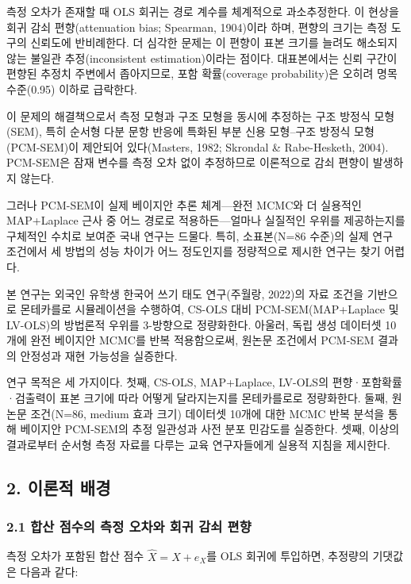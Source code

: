\documentclass[a4paper,10pt]{oblivoir}
\begin{document}
측정 오차가 존재할 때 OLS 회귀는 경로 계수를 체계적으로 과소추정한다. 이 현상을 회귀 감쇠 편향(attenuation bias; Spearman, 1904)이라 하며, 편향의 크기는 측정 도구의 신뢰도에 반비례한다. 더 심각한 문제는 이 편향이 표본 크기를 늘려도 해소되지 않는 불일관 추정(inconsistent estimation)이라는 점이다. 대표본에서는 신뢰 구간이 편향된 추정치 주변에서 좁아지므로, 포함 확률(coverage probability)은 오히려 명목 수준(0.95) 이하로 급락한다.

이 문제의 해결책으로서 측정 모형과 구조 모형을 동시에 추정하는 구조 방정식 모형(SEM), 특히 순서형 다분 문항 반응에 특화된 부분 신용 모형--구조 방정식 모형(PCM-SEM)이 제안되어 있다(Masters, 1982; Skrondal \& Rabe-Hesketh, 2004). PCM-SEM은 잠재 변수를 측정 오차 없이 추정하므로 이론적으로 감쇠 편향이 발생하지 않는다.

그러나 PCM-SEM이 실제 베이지안 추론 체계—완전 MCMC와 더 실용적인 MAP+Laplace 근사 중 어느 경로로 적용하든—얼마나 실질적인 우위를 제공하는지를 구체적인 수치로 보여준 국내 연구는 드물다. 특히, 소표본(N=86 수준)의 실제 연구 조건에서 세 방법의 성능 차이가 어느 정도인지를 정량적으로 제시한 연구는 찾기 어렵다.

본 연구는 외국인 유학생 한국어 쓰기 태도 연구(주월랑, 2022)의 자료 조건을 기반으로 몬테카를로 시뮬레이션을 수행하여, CS-OLS 대비 PCM-SEM(MAP+Laplace 및 LV-OLS)의 방법론적 우위를 3-방향으로 정량화한다. 아울러, 독립 생성 데이터셋 10개에 완전 베이지안 MCMC를 반복 적용함으로써, 원논문 조건에서 PCM-SEM 결과의 안정성과 재현 가능성을 실증한다.

연구 목적은 세 가지이다. 첫째, CS-OLS, MAP+Laplace, LV-OLS의 편향·포함확률·검출력이 표본 크기에 따라 어떻게 달라지는지를 몬테카를로로 정량화한다. 둘째, 원논문 조건(N=86, medium 효과 크기) 데이터셋 10개에 대한 MCMC 반복 분석을 통해 베이지안 PCM-SEM의 추정 일관성과 사전 분포 민감도를 실증한다. 셋째, 이상의 결과로부터 순서형 측정 자료를 다루는 교육 연구자들에게 실용적 지침을 제시한다.


\subsection{2. 이론적 배경}

\subsubsection{2.1 합산 점수의 측정 오차와 회귀 감쇠 편향}

측정 오차가 포함된 합산 점수 $\hat{X} = X + e_X$를 OLS 회귀에 투입하면, 추정량의 기댓값은 다음과 같다:
\end{document}
